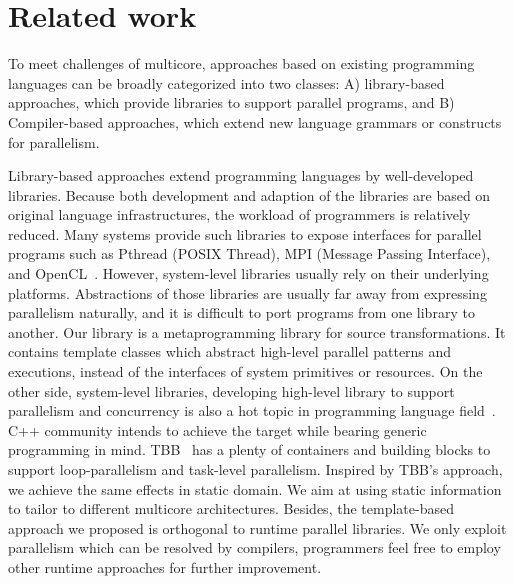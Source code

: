 \section{Related work}\label{sec:related}
To meet challenges of multicore, approaches based on existing
programming languages can be broadly categorized into two classes: A) library-based approaches, which
provide libraries to support parallel programs, and B) Compiler-based
approaches, which extend new language grammars or constructs for parallelism.

Library-based approaches extend programming languages
by well-developed libraries. Because both development and adaption of
the libraries are based on original language infrastructures, the
workload of programmers is relatively reduced. Many systems provide
such libraries to expose interfaces for parallel programs such as
Pthread (POSIX Thread), MPI (Message Passing Interface), and
OpenCL~\cite{opencl}. However, system-level libraries usually rely on 
their underlying platforms. Abstractions
of those libraries are usually far away from expressing parallelism
naturally, and it is difficult to
port programs from one library to another. Our library is a
metaprogramming library for source transformations. It contains template classes which abstract high-level parallel patterns
and executions, instead of the interfaces of system primitives or
resources. On the other side, system-level libraries, developing high-level
library to support parallelism and concurrency is also a hot topic in
programming language field~\cite{javacon, wincon}. C++ community intends to
achieve the target while bearing generic programming in mind.  TBB~\cite{tbb} has a plenty of
containers and building blocks to support loop-parallelism and
task-level parallelism.  Inspired by TBB's approach, we achieve the
same effects in static domain. We aim at using static information
to tailor to different multicore architectures. Besides, the template-based
approach we proposed is orthogonal to runtime parallel libraries. We
only exploit parallelism which can be resolved by compilers,
programmers feel free to employ other runtime approaches for further improvement.


